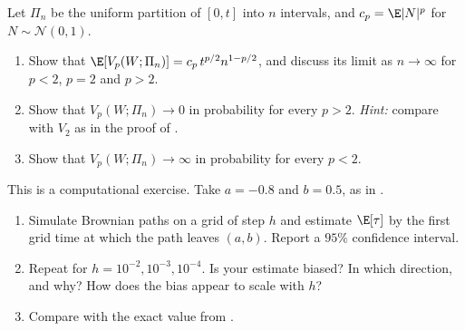 \begin{exercise}\label{ex:bm-pvariation}
\medium Let $\Pi_n$ be the uniform partition of $[0,t]$ into $n$ intervals, and
$c_p=\E|N|^p$ for $N\sim\mathcal N(0,1)$.
\begin{enumerate}[label=(\alph*)]
  \item Show that $\E[V_p(W;\Pi_n)]=c_p\,t^{p/2}n^{1-p/2}$, and discuss its limit as
    $n\to\infty$ for $p<2$, $p=2$ and $p>2$.
  \item Show that $V_p(W;\Pi_n)\to0$ in probability for every $p>2$. \emph{Hint:} compare
    with $V_2$ as in the proof of .
  \item Show that $V_p(W;\Pi_n)\to\infty$ in probability for every $p<2$.
\end{enumerate}
\end{exercise}

\begin{exercise}\label{ex:bm-exit-sim}
\medium This is a computational exercise. Take $a=-0.8$ and $b=0.5$, as in
.
\begin{enumerate}[label=(\alph*)]
  \item Simulate Brownian paths on a grid of step $h$ and estimate $\E[\tau]$ by the first
    grid time at which the path leaves $(a,b)$. Report a $95\%$ confidence interval.
  \item Repeat for $h=10^{-2},10^{-3},10^{-4}$. Is your estimate biased? In which
    direction, and why? How does the bias appear to scale with $h$?
  \item Compare with the exact value from .
\end{enumerate}
\end{exercise}
